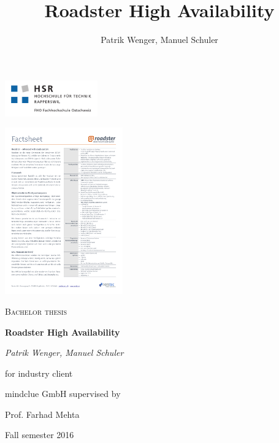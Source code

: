 \documentclass[a4paper]{report}
\title{Roadster High Availability}
\author{Patrik Wenger, Manuel Schuler}
\begin{document}


\thispagestyle{empty}

\begin{titlepage}
\centering
\begin{raggedleft}\includegraphics[trim=10 10 10 10, clip=true, width=0.3\textwidth]{img/hsr_logo.pdf}\end{raggedleft}
\begin{raggedright}\hfill\includegraphics[trim=14.8cm 27cm 1cm 1.4cm, clip=true, width=0.38\textwidth]{img/roadster_factsheet.pdf}\end{raggedright}

\par\vspace{30mm}
{\scshape\Large Bachelor thesis\par}
\vspace{1.5cm}
{\huge\bfseries Roadster High Availability\par}
\vspace{2cm}
{\Large\itshape Patrik Wenger, Manuel Schuler\par}
\vfill
for industry client\par
mindclue GmbH
\vfill
supervised by\par
Prof. Farhad Mehta

\vfill

{\large Fall semester 2016\par}
\end{titlepage}
\end{document}
